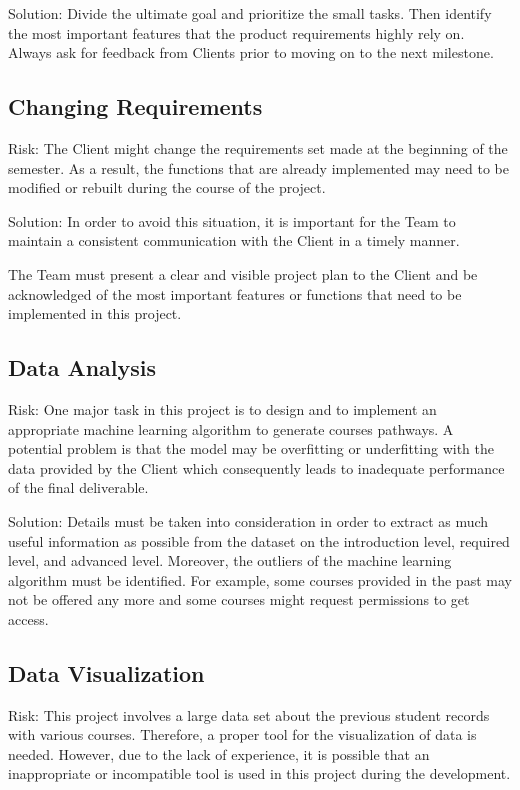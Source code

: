 \documentclass{article}
\begin{document}
\vspace{0.4cm}Solution: Divide the ultimate goal and prioritize the small tasks. Then identify the most important features that the product requirements highly rely on. Always ask for feedback from Clients prior to moving on to the next milestone.

\subsection{Changing Requirements}
Risk: The Client might change the requirements set made at the beginning of the semester. As a result, the functions that are already implemented may need to be modified or rebuilt during the course of the project.

\vspace{0.4cm}Solution: In order to avoid this situation, it is important for the Team to maintain a consistent communication with the Client in a timely manner.

\vspace{0.4cm}The Team must present a clear and visible project plan to the Client and be acknowledged of the most important features or functions that need to be implemented in this project.

\subsection{Data Analysis}
Risk: One major task in this project is to design and to implement an appropriate machine learning algorithm to generate courses pathways. A potential problem is that the model may be overfitting or underfitting with the data provided by the Client which consequently leads to inadequate performance of the final deliverable.

\vspace{0.4cm}Solution: Details must be taken into consideration in order to extract as much useful information as possible from the dataset on the introduction level, required level, and advanced level. Moreover, the outliers of the machine learning algorithm must be identified. For example, some courses provided in the past may not be offered any more and some courses might request permissions to get access.

\subsection{Data Visualization}
Risk: This project involves a large data set about the previous student records with various courses. Therefore, a proper tool for the visualization of data is needed. However, due to the lack of experience, it is possible that an inappropriate or incompatible tool is used in this project during the development.
\end{document}
